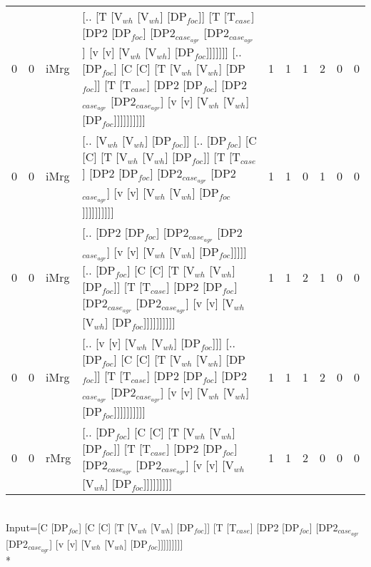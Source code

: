 \begin{tabularx}{\linewidth}{rrlXrrrrrr}
   0 &   0 & iMrg & [.. [T [V$_{wh}$ [V$_{wh}$] [DP$_{foc}$]] [T [T$_{case}$] [DP2 [DP$_{foc}$] [DP2$_{case_{agr}}$ [DP2$_{case_{agr}}$] [v [v] [V$_{wh}$ [V$_{wh}$] [DP$_{foc}$]]]]]]] [.. [DP$_{foc}$] [C [C] [T [V$_{wh}$ [V$_{wh}$] [DP$_{foc}$]] [T [T$_{case}$] [DP2 [DP$_{foc}$] [DP2$_{case_{agr}}$ [DP2$_{case_{agr}}$] [v [v] [V$_{wh}$ [V$_{wh}$] [DP$_{foc}$]]]]]]]]]]         &             1 &             1 &            1 &             2 &                0 &             0 \\
   0 &   0 & iMrg & [.. [V$_{wh}$ [V$_{wh}$] [DP$_{foc}$]] [.. [DP$_{foc}$] [C [C] [T [V$_{wh}$ [V$_{wh}$] [DP$_{foc}$]] [T [T$_{case}$] [DP2 [DP$_{foc}$] [DP2$_{case_{agr}}$ [DP2$_{case_{agr}}$] [v [v] [V$_{wh}$ [V$_{wh}$] [DP$_{foc}$]]]]]]]]]]                                                                                                      &             1 &             1 &            0 &             1 &                0 &             0 \\
   0 &   0 & iMrg & [.. [DP2 [DP$_{foc}$] [DP2$_{case_{agr}}$ [DP2$_{case_{agr}}$] [v [v] [V$_{wh}$ [V$_{wh}$] [DP$_{foc}$]]]]] [.. [DP$_{foc}$] [C [C] [T [V$_{wh}$ [V$_{wh}$] [DP$_{foc}$]] [T [T$_{case}$] [DP2 [DP$_{foc}$] [DP2$_{case_{agr}}$ [DP2$_{case_{agr}}$] [v [v] [V$_{wh}$ [V$_{wh}$] [DP$_{foc}$]]]]]]]]]]                                                 &             1 &             1 &            2 &             1 &                0 &             0 \\
   0 &   0 & iMrg & [.. [v [v] [V$_{wh}$ [V$_{wh}$] [DP$_{foc}$]]] [.. [DP$_{foc}$] [C [C] [T [V$_{wh}$ [V$_{wh}$] [DP$_{foc}$]] [T [T$_{case}$] [DP2 [DP$_{foc}$] [DP2$_{case_{agr}}$ [DP2$_{case_{agr}}$] [v [v] [V$_{wh}$ [V$_{wh}$] [DP$_{foc}$]]]]]]]]]]                                                                                              &             1 &             1 &            1 &             2 &                0 &             0 \\
   0 &   0 & rMrg & [.. [DP$_{foc}$] [C [C] [T [V$_{wh}$ [V$_{wh}$] [DP$_{foc}$]] [T [T$_{case}$] [DP2 [DP$_{foc}$] [DP2$_{case_{agr}}$ [DP2$_{case_{agr}}$] [v [v] [V$_{wh}$ [V$_{wh}$] [DP$_{foc}$]]]]]]]]]                                                                                                                                  &             1 &             1 &            2 &             0 &                0 &             0 \\
\hline
\end{tabularx}\endgroup\\
\begingroup\scriptsize Input=[C [DP$_{foc}$] [C [C] [T [V$_{wh}$ [V$_{wh}$] [DP$_{foc}$]] [T [T$_{case}$] [DP2 [DP$_{foc}$] [DP2$_{case_{agr}}$ [DP2$_{case_{agr}}$] [v [v] [V$_{wh}$ [V$_{wh}$] [DP$_{foc}$]]]]]]]]]\\*
